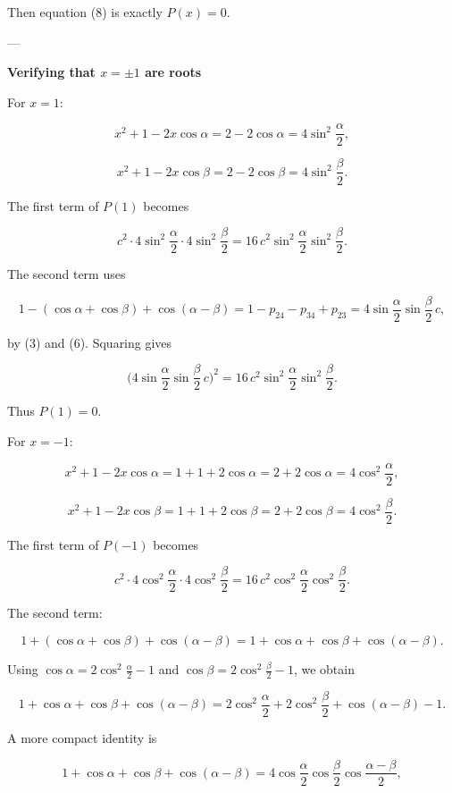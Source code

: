 \documentclass{article}
\begin{document}
Then equation (8) is exactly \(P(x)=0\).

---

\noindent\textbf{Verifying that \(x=\pm1\) are roots}  

For \(x=1\):  

\[
x^{2}+1-2x\cos\alpha = 2-2\cos\alpha = 4\sin^{2}\frac{\alpha}{2}, \tag{10}
\]  

\[
x^{2}+1-2x\cos\beta = 2-2\cos\beta = 4\sin^{2}\frac{\beta}{2}. \tag{11}
\]  

The first term of \(P(1)\) becomes  

\[
c^{2}\cdot 4\sin^{2}\frac{\alpha}{2}\cdot 4\sin^{2}\frac{\beta}{2}=16\,c^{2}\sin^{2}\frac{\alpha}{2}\sin^{2}\frac{\beta}{2}. \tag{12}
\]  

The second term uses  

\[
1-(\cos\alpha+\cos\beta)+\cos(\alpha-\beta)=1-p_{24}-p_{34}+p_{23}=4\sin\frac{\alpha}{2}\sin\frac{\beta}{2}\,c, \tag{13}
\]  

by (3) and (6). Squaring gives  

\[
\bigl(4\sin\frac{\alpha}{2}\sin\frac{\beta}{2}\,c\bigr)^{2}=16\,c^{2}\sin^{2}\frac{\alpha}{2}\sin^{2}\frac{\beta}{2}. \tag{14}
\]  

Thus \(P(1)=0\).  

For \(x=-1\):  

\[
x^{2}+1-2x\cos\alpha = 1+1+2\cos\alpha = 2+2\cos\alpha = 4\cos^{2}\frac{\alpha}{2}, \tag{15}
\]  

\[
x^{2}+1-2x\cos\beta = 1+1+2\cos\beta = 2+2\cos\beta = 4\cos^{2}\frac{\beta}{2}. \tag{16}
\]  

The first term of \(P(-1)\) becomes  

\[
c^{2}\cdot 4\cos^{2}\frac{\alpha}{2}\cdot 4\cos^{2}\frac{\beta}{2}=16\,c^{2}\cos^{2}\frac{\alpha}{2}\cos^{2}\frac{\beta}{2}. \tag{17}
\]  

The second term:  

\[
1+(\cos\alpha+\cos\beta)+\cos(\alpha-\beta)=1+\cos\alpha+\cos\beta+\cos(\alpha-\beta). \tag{18}
\]  

Using \(\cos\alpha=2\cos^{2}\frac{\alpha}{2}-1\) and \(\cos\beta=2\cos^{2}\frac{\beta}{2}-1\), we obtain  

\[
1+\cos\alpha+\cos\beta+\cos(\alpha-\beta)=2\cos^{2}\frac{\alpha}{2}+2\cos^{2}\frac{\beta}{2}+\cos(\alpha-\beta)-1. \tag{19}
\]  

A more compact identity is  

\[
1+\cos\alpha+\cos\beta+\cos(\alpha-\beta)=4\cos\frac{\alpha}{2}\cos\frac{\beta}{2}\cos\frac{\alpha-\beta}{2}, \tag{20}
\]  
\end{document}
